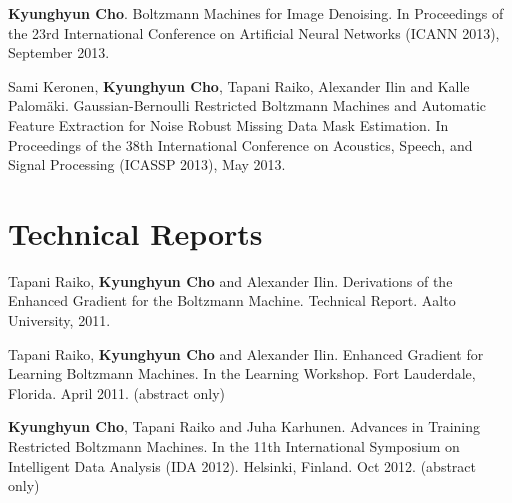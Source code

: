 \documentclass[11pt, oneside]{essay}
\begin{document}
\textbf{Kyunghyun Cho}. Boltzmann Machines for Image Denoising. In
Proceedings of the 23rd International Conference on
Artificial Neural Networks (ICANN 2013), September 2013.

Sami Keronen, \textbf{Kyunghyun Cho}, Tapani Raiko, Alexander Ilin
and Kalle Palom\"aki. Gaussian-Bernoulli Restricted Boltzmann
Machines and Automatic Feature Extraction for Noise Robust
Missing Data Mask Estimation. In Proceedings of the 38th
International Conference on Acoustics, Speech, and Signal
Processing (ICASSP 2013), May 2013.




\section{Technical Reports}

Tapani Raiko, \textbf{Kyunghyun Cho} and Alexander Ilin.
Derivations of the Enhanced Gradient for the Boltzmann
Machine.  Technical Report. Aalto University, 2011.

Tapani Raiko, \textbf{Kyunghyun Cho} and Alexander Ilin.
Enhanced Gradient for Learning Boltzmann Machines.
In the Learning Workshop. Fort Lauderdale, Florida. April
2011. (abstract only)

\textbf{Kyunghyun Cho}, Tapani Raiko and Juha Karhunen.
Advances in Training Restricted Boltzmann Machines.
In the 11th International Symposium on Intelligent Data
Analysis (IDA 2012). Helsinki, Finland. Oct 2012. (abstract
only)
\end{document}
